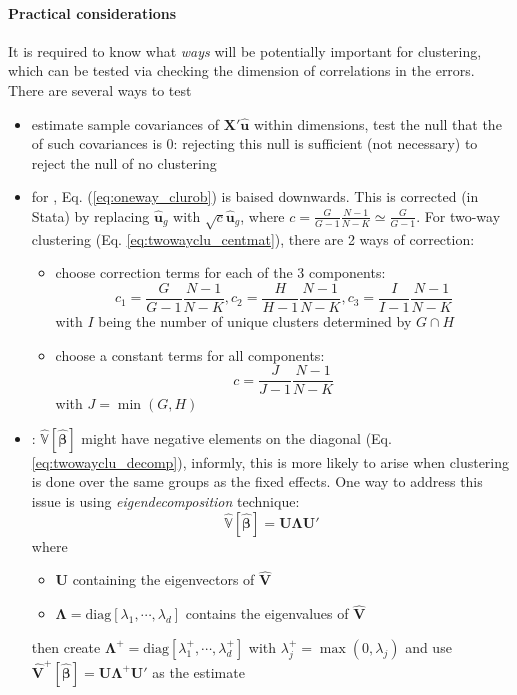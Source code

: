 \documentclass[twoside]{article}
\begin{document}
\paragraph*{Practical considerations} It is required to know what \textit{ways} will be potentially important for clustering, which can be tested via checking the dimension of correlations in the errors. There are several ways to test 
\begin{itemize}
    \item estimate sample covariances of $\mathbf{X}'\hat{\mathbf{u}}$ within dimensions, test the null that the  of such covariances is 0: rejecting this null is sufficient (not necessary) to reject the null of no clustering \citep{white1980heteroskedasticity}
    \item for , Eq. (\ref{eq:oneway_clurob}) is baised downwards. This is corrected (in Stata) by replacing $\hat{\mathbf{u}}_g$ with $\sqrt{c}\hat{\mathbf{u}}_g$, where $c = \frac{G}{G-1}\frac{N-1}{N-K}\simeq \frac{G}{G-1}$. For two-way clustering (Eq. \ref{eq:twowayclu_centmat}), there are 2 ways of correction:
    \begin{itemize}
        \item choose correction terms for each of the 3 components: $$c_1= \frac{G}{G-1}\frac{N-1}{N-K}, c_2= \frac{H}{H-1}\frac{N-1}{N-K},c_3=\frac{I}{I-1}\frac{N-1}{N-K}$$ with $I$ being the number of unique clusters determined by $G\cap H$
        \item choose a constant terms for all components: $$c=\frac{J}{J-1}\frac{N-1}{N-K}$$ with $J=\min(G,H)$
    \end{itemize}
    \item {}: $\hat{\mathbb{V}}\left[\hat{\boldsymbol{\beta}}\right]$ might have negative elements on the diagonal (Eq. \ref{eq:twowayclu_decomp}), informly, this is more likely to  arise when clustering is done over the same groups as the fixed effects. One way to address this issue is using \textit{eigendecomposition} technique:
    $$
    \hat{\mathbb{V}}\left[\hat{\boldsymbol{\beta}}\right] = \mathbf{U}\boldsymbol{\Lambda}\mathbf{U}'
    $$
    where 
    \begin{itemize}
        \item $\mathbf{U}$ containing the eigenvectors of $\hat{\mathbf{V}}$
        \item $\boldsymbol{\Lambda} = \mathrm{diag}\left[\lambda_1,\cdots,\lambda_d\right]$ contains the eigenvalues of $\hat{\mathbf{V}}$ 
    \end{itemize}
    then create $\boldsymbol{\Lambda}^+ = \mathrm{diag} \left[\lambda_1^+,\cdots,\lambda_d^+\right]$ with $\lambda^+_j=\max\left(0,\lambda_j\right)$ and use $\hat{\mathbf{V}}^+\left[\hat{\boldsymbol{\beta}}\right]=\mathbf{U}\boldsymbol{\Lambda}^+\mathbf{U}'$ as the estimate
\end{itemize}
\end{document}
